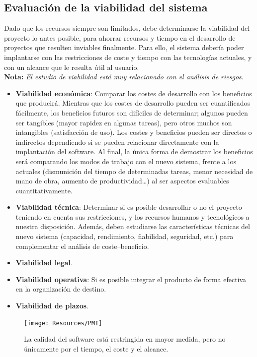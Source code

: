 \subsection{Evaluación de la viabilidad del sistema}

Dado que los recursos siempre son limitados, debe determinarse la viabilidad del proyecto lo antes posible, para ahorrar recursos y tiempo en el desarrollo de proyectos que resulten inviables finalmente. Para ello, el sistema debería poder implantarse con las restricciones de coste y tiempo con las tecnologías actuales, y con un alcance que le resulta útil al usuario.\\

\textbf{Nota:} \textit{El estudio de viabilidad está muy relacionado con el análisis de riesgos}.

\begin{itemize}
    \item \textbf{Viabilidad económica}: Comparar los costes de desarrollo con los beneficios que producirá. Mientras que los costes de desarrollo pueden ser cuantificados fácilmente, los beneficios futuros son difíciles de determinar; algunos pueden ser tangibles (mayor rapidez en algunas tareas), pero otros muchos son intangibles (satisfacción de uso). Los costes y beneficios pueden ser directos o indirectos dependiendo si se pueden relacionar directamente con la implantación del software. Al final, la única forma de demostrar los beneficios será comparando los modos de trabajo con el nuevo sistema, frente a los actuales (dismunición del tiempo de determinadas tareas, menor necesidad de mano de obra, aumento de productividad\ldots) al ser aspectos evaluables cuantitativamente.
    \item \textbf{Viabilidad técnica}: Determinar si es posible desarrollar o no el proyecto teniendo en cuenta sus restricciones, y los recursos humanos y tecnológicos a nuestra disposición. Además, deben estudiarse las características técnicas del nuevo sistema (capacidad, rendimiento, fiabilidad, seguridad, etc.) para complementar el análisis de coste--beneficio. 
    \item \textbf{Viabilidad legal}.
    \item \textbf{Viabilidad operativa}: Si es posible integrar el producto de forma efectiva en la organización de destino.
    \item \textbf{Viabilidad de plazos}.
\end{itemize}

\begin{figure}[H]
    \centering
    \texttt{[image: Resources/PMI]}
    \caption{La calidad del software está restringida en mayor medida, pero no únicamente por el tiempo, el coste y el alcance.}
    \label{fig:PMI}
\end{figure}

